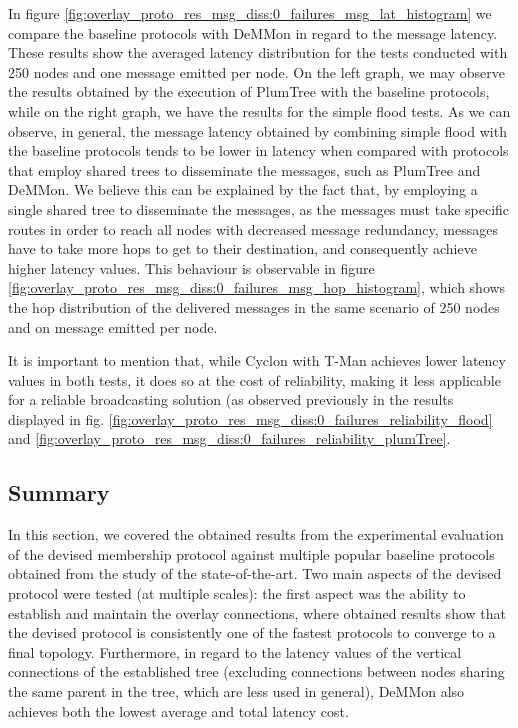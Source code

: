 In figure \ref{fig:overlay_proto_res_msg_diss:0_failures_msg_lat_histogram} we compare the baseline protocols with DeMMon in regard to the message latency. These results show the averaged latency distribution for the tests conducted with 250 nodes and one message emitted per node. On the left graph, we may observe the results obtained by the execution of PlumTree with the baseline protocols, while on the right graph, we have the results for the simple flood tests. As we can observe, in general, the message latency obtained by combining simple flood with the baseline protocols tends to be lower in latency when compared with protocols that employ shared trees to disseminate the messages, such as PlumTree and DeMMon. We believe this can be explained by the fact that, by employing a single shared tree to disseminate the messages, as the messages must take specific routes in order to reach all nodes with decreased message redundancy, messages have to take more hops to get to their destination, and consequently achieve higher latency values. This behaviour is observable in figure \ref{fig:overlay_proto_res_msg_diss:0_failures_msg_hop_histogram}, which shows the hop distribution of the delivered messages in the same scenario of 250 nodes and on message emitted per node.

It is important to mention that, while Cyclon with T-Man achieves lower latency values in both tests, it does so at the cost of reliability, making it less applicable for a reliable broadcasting solution (as observed previously in the results displayed in fig. \ref{fig:overlay_proto_res_msg_diss:0_failures_reliability_flood} and \ref{fig:overlay_proto_res_msg_diss:0_failures_reliability_plumTree}.


\subsection{Summary}

In this section, we covered the obtained results from the experimental evaluation of the devised membership protocol against multiple popular baseline protocols obtained from the study of the state-of-the-art. Two main aspects of the devised protocol were tested (at multiple scales): the first aspect was the ability to establish and maintain the overlay connections, where obtained results show that the devised protocol is consistently one of the fastest protocols to converge to a final topology. Furthermore, in regard to the latency values of the vertical connections of the established tree (excluding connections between nodes sharing the same parent in the tree, which are less used in general), DeMMon also achieves both the lowest average and total latency cost.

